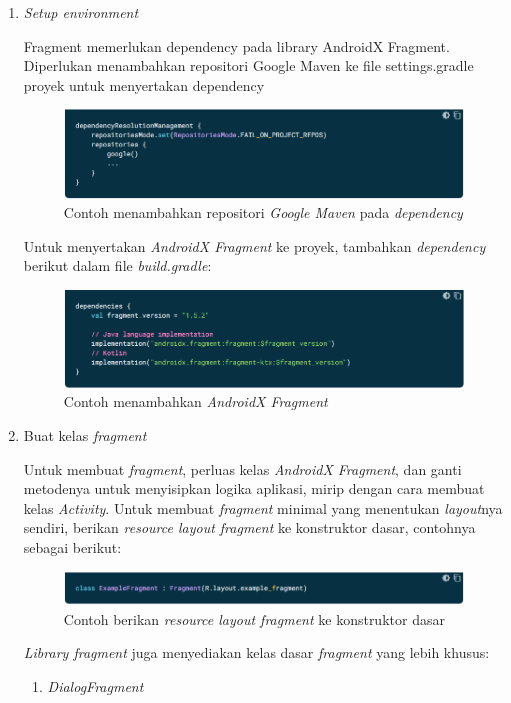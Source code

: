 \begin{enumerate}
\item \textit{Setup environment}

Fragment memerlukan dependency pada library AndroidX Fragment. Diperlukan menambahkan repositori Google Maven ke file settings.gradle proyek untuk menyertakan dependency
\begin{figure}[H]
	\centering
	\includegraphics[keepaspectratio, width=12cm]{gambar/fragment_setup_environment1}
	\caption{Contoh menambahkan repositori \textit{Google Maven} pada \textit{dependency} \citep{developerandroid}}
	\label{gambar:gambar_29}
\end{figure}
Untuk menyertakan \textit{AndroidX Fragment} ke proyek, tambahkan \textit{dependency} berikut dalam file \textit{build.gradle}:
\begin{figure}[H]
	\centering
	\includegraphics[keepaspectratio, width=12cm]{gambar/fragment_setup_environment2}
	\caption{Contoh menambahkan \textit{AndroidX Fragment} \citep{developerandroid}}
	\label{gambar:gambar_30}
\end{figure}
\item Buat kelas \emph{fragment}

Untuk membuat \textit{fragment}, perluas kelas \textit{AndroidX Fragment}, dan ganti metodenya untuk menyisipkan logika aplikasi, mirip dengan cara membuat kelas \textit{Activity}. Untuk membuat \textit{fragment} minimal yang menentukan \textit{layout}nya sendiri, berikan \textit{resource layout fragment} ke konstruktor dasar, contohnya sebagai berikut:
\begin{figure}[H]
	\centering
	\includegraphics[keepaspectratio, width=12cm]{gambar/fragment_class}
	\caption{Contoh berikan \textit{resource layout fragment} ke konstruktor dasar \citep{developerandroid}}
	\label{gambar:gambar_31}
\end{figure}
\textit{Library fragment} juga menyediakan kelas dasar \textit{fragment} yang lebih khusus:
	\begin{enumerate}
	\item \emph{DialogFragment}
	

\end{enumerate}
\end{enumerate}
